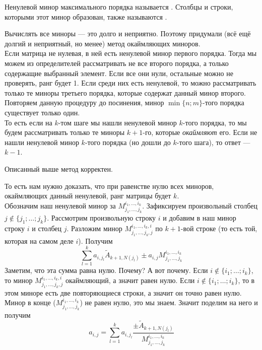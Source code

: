 \documentclass{article}
\begin{document}
\begin{itemize}
\begin{Proof}
        \end{Proof}
        \dfn Ненулевой минор максимального порядка называется . Столбцы и строки, которыми этот минор образован, также называются .
        \begin{Comment}
            Вычислять все миноры --- это долго и неприятно. Поэтому придумали (всё ещё долгий и неприятный, но менее) метод окаймляющих миноров.\\
            Если матрица не нулевая, в ней есть ненулевой минор первого порядка. Тогда мы можем из определителей рассматривать не все второго порядка, а только содержащие выбранный элемент. Если все они нули, остальные можно не проверять, ранг будет 1. Если среди них есть ненулевой, то можно рассматривать только те миноры третьего порядка, которые содержат данный минор второго. Повторяем данную процедуру до посинения, минор $\min\{n;m\}$-того порядка существует только один.\\
            То есть если на $k$-том шаге мы нашли ненулевой минор $k$-того порядка, то мы будем рассматривать только те миноры $k+1$-го, которые \textit{окаймляют} его. Если не нашли ненулевой минор $k$-того порядка (но дошли до $k$-того шага), то ответ --- $k-1$.
        \end{Comment}
        \thm Описанный выше метод корректен.
        \begin{Proof}
            То есть нам нужно доказать, что при равенстве нулю всех миноров, окаймляющих данный ненулевой, ранг матрицы будет $k$.\\
            Обозначим наш ненулевой минор за $M_{j_1,\ldots,j_k}^{i_1,\ldots,i_k}$. Зафиксируем произвольный столбец $j\notin\{j_1;\ldots;j_k\}$. Рассмотрим произвольную строку $i$ и добавим в наш минор строку $i$ и столбец $j$. Разложим минор $M_{j_1,\ldots,j_k,j}^{i_1,\ldots,i_k,i}$ по $k+1$-вой строке (то есть той, которая на самом деле $i$). Получим
            $$
            \sum_{l=1}^ka_{i,j_l}\tilde A_{k+1,N(j_l)}\pm a_{i,j}M_{j_1,\ldots,j_k}^{i_1,\ldots,i_k}
            $$
            Заметим, что эта сумма равна нулю. Почему? А вот почему. Если $i\notin\{i_1;\ldots;i_k\}$, то минор $M_{j_1,\ldots,j_k,j}^{i_1,\ldots,i_k,i}$ окаймляющий, а значит равен нулю. Если $i\notin\{i_1;\ldots;i_k\}$, то в этом миноре есть две повторяющиеся строки, а значит он точно равен нулю. Минор в конце ($M_{j_1,\ldots,j_k}^{i_1,\ldots,i_k}$) не равен нулю, это мы знаем. Значит поделим на него и получим
            $$
            a_{i,j}=\sum_{l=1}^ka_{i,j_l}\frac{\pm\tilde A_{k+1,N(j_l)}}{M_{j_1,\ldots,j_k}^{i_1,\ldots,i_k}}
$$
\end{Proof}
\end{itemize}
\end{document}
